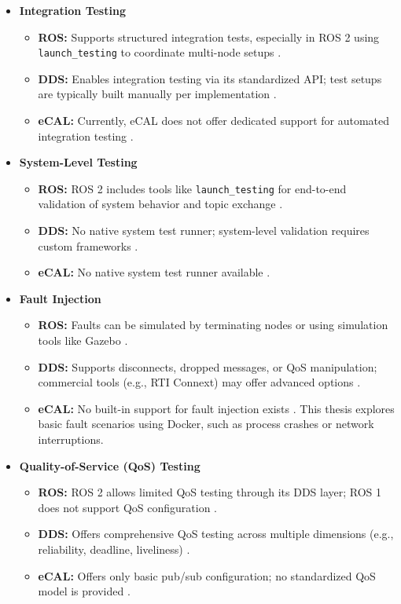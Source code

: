 {\begin{itemize}
	\item \textbf{Integration Testing}
	\begin{itemize}
		\item \textbf{ROS:} Supports structured integration tests, especially in ROS 2 using \texttt{launch\_testing} to coordinate multi-node setups \cite{ros2_launch_testing}.
		\item \textbf{DDS:} Enables integration testing via its standardized API; test setups are typically built manually per implementation \cite{pardo2003}.
		\item \textbf{eCAL:} Currently, eCAL does not offer dedicated support for automated integration testing \cite{ecal_official_docs}.
	\end{itemize}
	
	\item \textbf{System-Level Testing}
	\begin{itemize}
		\item \textbf{ROS:} ROS 2 includes tools like \texttt{launch\_testing} for end-to-end validation of system behavior and topic exchange \cite{ros2_launch_testing}.
		\item \textbf{DDS:} No native system test runner; system-level validation requires custom frameworks \cite{rti_connext_dds}.
		\item \textbf{eCAL:} No native system test runner available \cite{ecal_official_docs}.
	\end{itemize}
	
	\item \textbf{Fault Injection}
	\begin{itemize}
		\item \textbf{ROS:} Faults can be simulated by terminating nodes or using simulation tools like Gazebo \cite{quigley2009}.
		\item \textbf{DDS:} Supports disconnects, dropped messages, or QoS manipulation; commercial tools (e.g., RTI Connext) may offer advanced options \cite{rti_connext_dds}.
		\item \textbf{eCAL:} No built-in support for fault injection exists \cite{ecal_official_docs}. This thesis explores basic fault scenarios using Docker, such as process crashes or network interruptions.
	\end{itemize}
	
	\newpage
	\item \textbf{Quality-of-Service (QoS) Testing}
	\begin{itemize}
		\item \textbf{ROS:} ROS 2 allows limited QoS testing through its DDS layer; ROS 1 does not support QoS configuration \cite{ros2_launch_testing}.
		\item \textbf{DDS:} Offers comprehensive QoS testing across multiple dimensions (e.g., reliability, deadline, liveliness) \cite{pardo2003}.
		\item \textbf{eCAL:} Offers only basic pub/sub configuration; no standardized QoS model is provided \cite{ecal_official_docs}.
	\end{itemize}
	

\end{itemize}}
